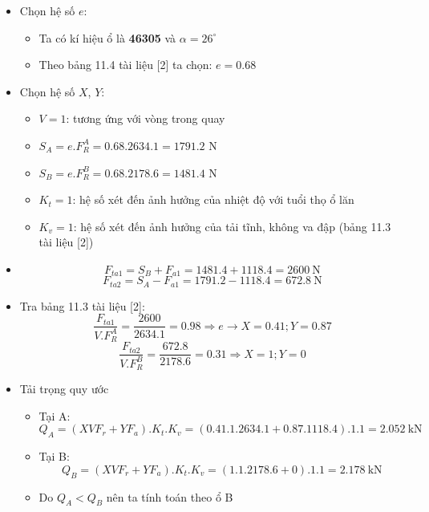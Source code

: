 \begin{itemize}
    \item Chọn hệ số $e$:
    \begin{itemize}
        \item Ta có kí hiệu ổ là \textbf{46305} và $\alpha = 26^\circ$
        \item Theo bảng 11.4 tài liệu [2] ta chọn: $e = 0.68$
    \end{itemize}

    \item Chọn hệ số $X$, $Y$:
    \begin{itemize}
        \item $V = 1$: tương ứng với vòng trong quay
        \item $S_A = e.F_R^A = 0.68.2634.1 = 1791.2$ N
        \item $S_B = e.F_R^B = 0.68.2178.6 = 1481.4$ N
        \item $K_t = 1$: hệ số xét đến ảnh hưởng của nhiệt độ với tuổi thọ ổ lăn
        \item $K_v = 1$: hệ số xét đến ảnh hưởng của tải tĩnh, không va đập (bảng 11.3 tài liệu [2])
    \end{itemize}

    \item 
    \[
        F_{ta1} = S_B + F_{a1} = 1481.4 + 1118.4 = 2600 \ \text{N}
    \]
    \[
        F_{ta2} = S_A - F_{a1} = 1791.2 - 1118.4 = 672.8 \ \text{N}
    \]

    \item Tra bảng 11.3 tài liệu [2]:
    \[
        \frac{F_{ta1}}{V.F_R^A} = \frac{2600}{2634.1} = 0.98 \Rightarrow e \rightarrow X = 0.41; Y = 0.87
    \]
    \[
        \frac{F_{ta2}}{V.F_R^B} = \frac{672.8}{2178.6} = 0.31 \Rightarrow X = 1; Y = 0
    \]

    \item Tải trọng quy ước
    \begin{itemize}
        \item Tại A:
        \[
            Q_A = (X V F_r + Y F_a).K_t.K_v = (0.41.1.2634.1 + 0.87.1118.4).1.1 = 2.052 \ \text{kN}
        \]

        \item Tại B:
        \[
            Q_B = (X V F_r + Y F_a).K_t.K_v = (1.1.2178.6 + 0).1.1 = 2.178 \ \text{kN}
        \]

        \item Do $Q_A < Q_B$ nên ta tính toán theo ổ B
    \end{itemize}


\end{itemize}
